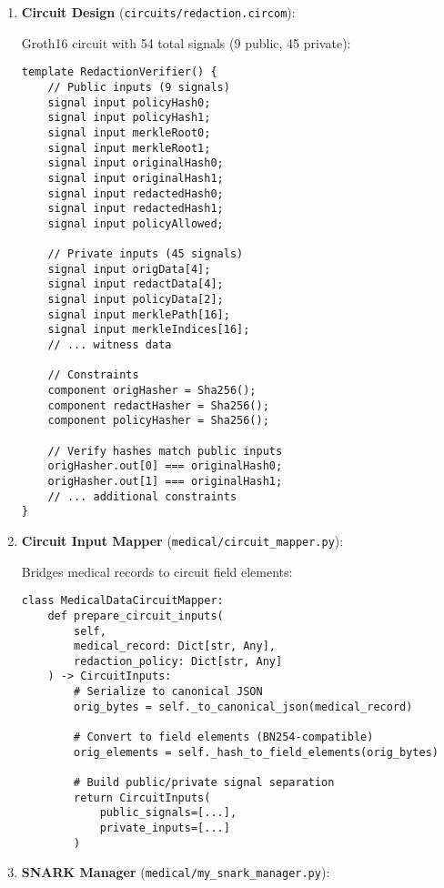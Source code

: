 \begin{enumerate}
    \item \textbf{Circuit Design} (\texttt{circuits/redaction.circom}):
    
    Groth16 circuit with 54 total signals (9 public, 45 private):
    
    \begin{verbatim}
template RedactionVerifier() {
    // Public inputs (9 signals)
    signal input policyHash0;
    signal input policyHash1;
    signal input merkleRoot0;
    signal input merkleRoot1;
    signal input originalHash0;
    signal input originalHash1;
    signal input redactedHash0;
    signal input redactedHash1;
    signal input policyAllowed;
    
    // Private inputs (45 signals)
    signal input origData[4];
    signal input redactData[4];
    signal input policyData[2];
    signal input merklePath[16];
    signal input merkleIndices[16];
    // ... witness data
    
    // Constraints
    component origHasher = Sha256();
    component redactHasher = Sha256();
    component policyHasher = Sha256();
    
    // Verify hashes match public inputs
    origHasher.out[0] === originalHash0;
    origHasher.out[1] === originalHash1;
    // ... additional constraints
}
\end{verbatim}
    
    \item \textbf{Circuit Input Mapper} (\texttt{medical/circuit\_mapper.py}):
    
    Bridges medical records to circuit field elements:
    
    \begin{verbatim}
class MedicalDataCircuitMapper:
    def prepare_circuit_inputs(
        self,
        medical_record: Dict[str, Any],
        redaction_policy: Dict[str, Any]
    ) -> CircuitInputs:
        # Serialize to canonical JSON
        orig_bytes = self._to_canonical_json(medical_record)
        
        # Convert to field elements (BN254-compatible)
        orig_elements = self._hash_to_field_elements(orig_bytes)
        
        # Build public/private signal separation
        return CircuitInputs(
            public_signals=[...],
            private_inputs=[...]
        )
\end{verbatim}
    
    \item \textbf{SNARK Manager} (\texttt{medical/my\_snark\_manager.py}):
    

\end{enumerate}
